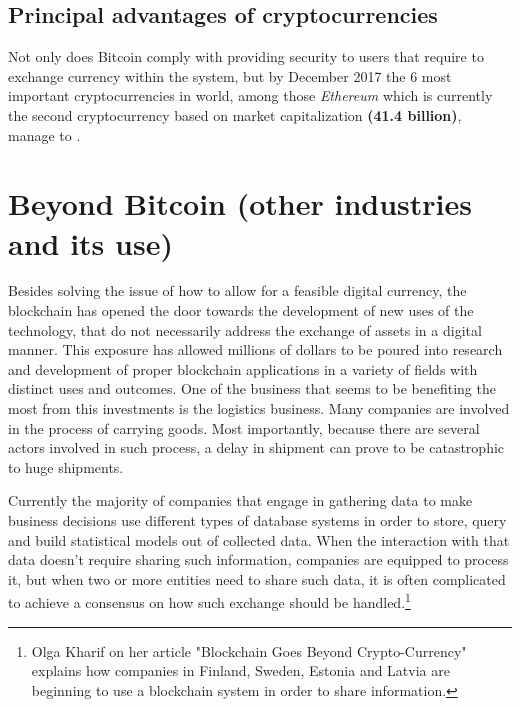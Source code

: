 \documentclass[submission,copyright,creativecommons]{eptcs}
\begin{document}
\subsection{Principal advantages of cryptocurrencies}
Not only does Bitcoin comply with providing security to users that require to exchange currency within the system, but by December 2017\cite{MostImportantCryptocurrencies} the 6 most important cryptocurrencies in world, among those \textit{Ethereum} which is currently the second cryptocurrency based on market capitalization \textbf{(41.4 billion)}, manage to .

\section{Beyond Bitcoin (other industries and its use)}
Besides solving the issue of how to allow for a feasible digital currency, the blockchain has opened the door towards the development of new uses of the technology, that do not necessarily address the exchange of assets in a digital manner.  This exposure has allowed millions of dollars to be poured into research and development of proper blockchain applications in a variety of fields with distinct uses and outcomes.
One of the business that seems to be benefiting the most from this investments is the logistics business. Many companies are involved in the process of carrying goods. Most importantly, because there are several actors involved in such process, a delay in shipment can prove to be catastrophic to huge shipments.  

Currently the majority of companies that engage in gathering data to make business decisions use different types of database systems in order to store, query and build statistical models out of collected data.  When the interaction with that data doesn't require sharing such information, companies are equipped to process it, but when two or more entities\cite{BlockchainGoesCryptoCurrency2016} need to share such data, it is often complicated to achieve a consensus on how such exchange should be handled.\footnote{Olga Kharif on her article "Blockchain Goes Beyond Crypto-Currency" explains how companies in Finland, Sweden, Estonia and Latvia are beginning to use a blockchain system in order to share information.}
\end{document}
